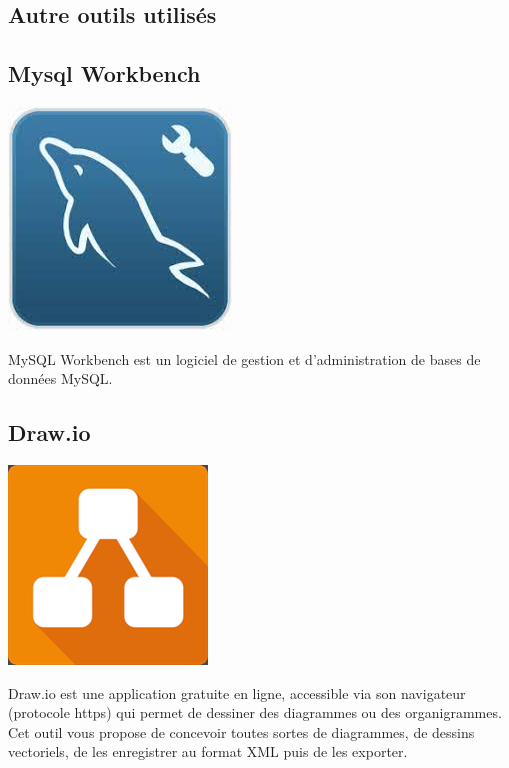 		\subsection{Autre outils utilisés}
			\subsection*{Mysql Workbench}
				\begin{center}
					\includegraphics[scale=0.5]{chap_2/workbench.jpeg}
					\label{Mysql Workbench}
					\cite{logo_workbench}
				\end{center}
				MySQL Workbench est un logiciel de gestion et d'administration de bases de données MySQL.
			\subsection*{Draw.io}
				\begin{center}
					\includegraphics[scale=2]{chap_2/drawio.png}
					\label{Draw.io}
					\cite{logo_drawio}
				\end{center}
			Draw.io est une application gratuite en ligne, accessible via son navigateur (protocole https) qui permet de dessiner des diagrammes ou des organigrammes. Cet outil vous propose de concevoir toutes sortes de diagrammes, de dessins vectoriels, de les enregistrer au format XML puis de les exporter.\cite{draw_definition}